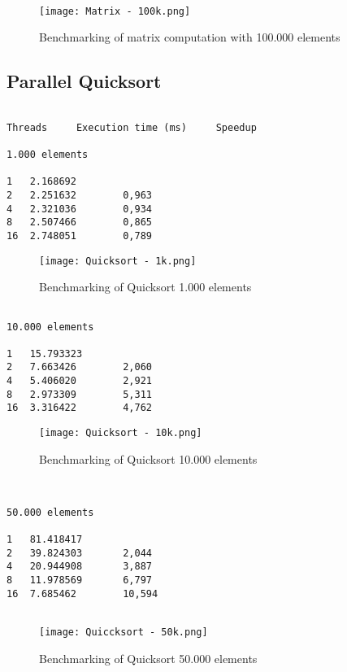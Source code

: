 \documentclass{article}
\begin{document}
\begin{figure}[h]
\centering
\texttt{[image: Matrix - 100k.png]}
\caption{Benchmarking of matrix computation with 100.000 elements}
\end{figure}      
\clearpage


\subsection{Parallel Quicksort}

\begin{verbatim}

Threads     Execution time (ms)     Speedup

1.000 elements

1   2.168692			
2   2.251632        0,963
4   2.321036        0,934		
8   2.507466        0,865 
16  2.748051        0,789
\end{verbatim}

\begin{figure}[h]
\centering
\texttt{[image: Quicksort - 1k.png]}
\caption{Benchmarking of Quicksort 1.000 elements}
\end{figure}      
\clearpage

\begin{verbatim}
    
10.000 elements

1   15.793323 
2   7.663426        2,060 
4   5.406020        2,921	 
8   2.973309        5,311 
16  3.316422        4,762

\end{verbatim}

\begin{figure}[h]
\centering
\texttt{[image: Quicksort - 10k.png]}
\caption{Benchmarking of Quicksort 10.000 elements}
\end{figure}      
\clearpage


\begin{verbatim}
    

50.000 elements

1   81.418417	 
2   39.824303       2,044  
4   20.944908       3,887	 
8   11.978569       6,797	 
16  7.685462        10,594 
 
\end{verbatim}

\begin{figure}[h]
\centering
\texttt{[image: Quiccksort - 50k.png]}
\caption{Benchmarking of Quicksort 50.000 elements}
\end{figure}      
\clearpage
\end{document}
